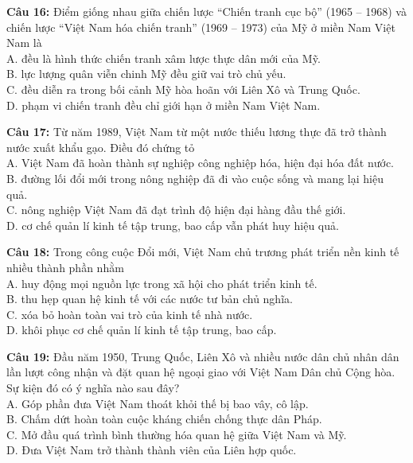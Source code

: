 \documentclass[12pt,a4paper]{article}
\begin{document}
\noindent \textbf{Câu 16:} Điểm giống nhau giữa chiến lược ``Chiến tranh cục bộ'' (1965 -- 1968) và chiến lược ``Việt Nam hóa chiến tranh'' (1969 -- 1973) của Mỹ ở miền Nam Việt Nam là\\
\noindent A. đều là hình thức chiến tranh xâm lược thực dân mới của Mỹ.\\
\noindent B. lực lượng quân viễn chinh Mỹ đều giữ vai trò chủ yếu.\\
\noindent C. đều diễn ra trong bối cảnh Mỹ hòa hoãn với Liên Xô và Trung Quốc.\\
\noindent D. phạm vi chiến tranh đều chỉ giới hạn ở miền Nam Việt Nam.

\noindent \textbf{Câu 17:} Từ năm 1989, Việt Nam từ một nước thiếu lương thực đã trở thành nước xuất khẩu gạo. Điều đó chứng tỏ\\
\noindent A. Việt Nam đã hoàn thành sự nghiệp công nghiệp hóa, hiện đại hóa đất nước.\\
\noindent B. đường lối đổi mới trong nông nghiệp đã đi vào cuộc sống và mang lại hiệu quả.\\
\noindent C. nông nghiệp Việt Nam đã đạt trình độ hiện đại hàng đầu thế giới.\\
\noindent D. cơ chế quản lí kinh tế tập trung, bao cấp vẫn phát huy hiệu quả.

\noindent \textbf{Câu 18:} Trong công cuộc Đổi mới, Việt Nam chủ trương phát triển nền kinh tế nhiều thành phần nhằm\\
\noindent A. huy động mọi nguồn lực trong xã hội cho phát triển kinh tế.\\
\noindent B. thu hẹp quan hệ kinh tế với các nước tư bản chủ nghĩa.\\
\noindent C. xóa bỏ hoàn toàn vai trò của kinh tế nhà nước.\\
\noindent D. khôi phục cơ chế quản lí kinh tế tập trung, bao cấp.

\noindent \textbf{Câu 19:} Đầu năm 1950, Trung Quốc, Liên Xô và nhiều nước dân chủ nhân dân lần lượt công nhận và đặt quan hệ ngoại giao với Việt Nam Dân chủ Cộng hòa. Sự kiện đó có ý nghĩa nào sau đây?\\
\noindent A. Góp phần đưa Việt Nam thoát khỏi thế bị bao vây, cô lập.\\
\noindent B. Chấm dứt hoàn toàn cuộc kháng chiến chống thực dân Pháp.\\
\noindent C. Mở đầu quá trình bình thường hóa quan hệ giữa Việt Nam và Mỹ.\\
\noindent D. Đưa Việt Nam trở thành thành viên của Liên hợp quốc.
\end{document}
